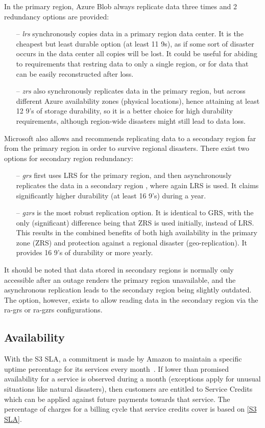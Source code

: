 \bigskip
In the primary region, Azure Blob always replicate data three times and 2 redundancy options are provided: ~\cite{blobinfo}
\begin{itemize}
    \item [--] \textit{\ac{lrs}} synchronously copies data in a primary region data center. It is the cheapest but least durable option (at least 11 9s), as if some sort of disaster occurs in the data center all copies will be lost. It could be useful for abiding to requirements that restring data to only a single region, or for data that can be easily reconstructed after loss.

    \item[--] \textit{\ac{zrs}} also synchronously replicates data in the primary region, but across different Azure availability zones (physical locations), hence attaining at least 12 9's of storage durability, so it is a better choice for high durability requirements, although region-wide disasters might still lead to data loss.
\end{itemize}

Microsoft also allows and recommends replicating data to a secondary region far from the primary region in order to survive regional disasters. There exist two options for secondary region redundancy:
\begin{itemize}
    \item [--]  \textit{\ac{grs}} first uses LRS for the primary region, and then asynchronously replicates the data in a secondary region , where again LRS is used. It claims significantly higher durability (at least 16 9's) during a year.

    \item [--] \textit{\ac{gzrs}} is the most robust replication option. It is identical to GRS, with the only (significant) difference being that ZRS is used initially, instead of LRS. This results in the combined benefits of both high availability in the primary zone (ZRS) and protection against a regional disaster (geo-replication). It provides 16 9's of durability or more yearly.
\end{itemize}
It should be noted that data stored in secondary regions is normally only accessible after an outage renders the primary region unavailable, and the asynchronous replication leads to the secondary region being slightly outdated. The option, however, exists to allow reading data in the secondary region via the \ac{ra-grs} or \ac{ra-gzrs} configurations.

\subsection{Availability}
With the S3 SLA, a commitment is made by Amazon to maintain a specific uptime percentage for its services every month~\cite{s3sla}. If lower than promised availability for a service is observed during a month (exceptions apply for unusual situations like natural disasters), then customers are entitled to Service Credits which can be applied against future payments towards that service. The percentage of charges for a billing cycle that service credits cover is based on \autoref{S3 SLA}.

